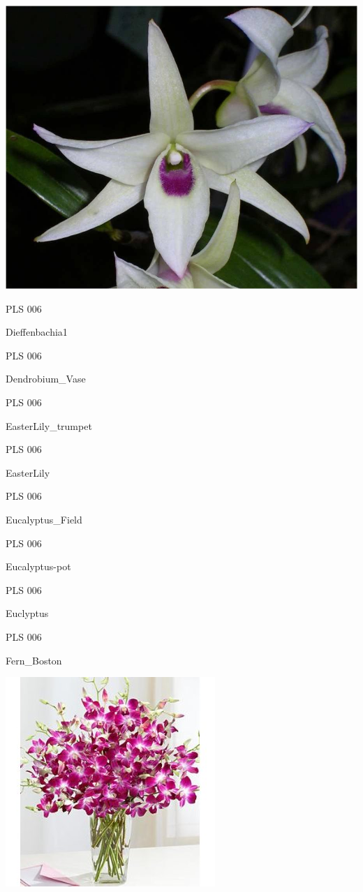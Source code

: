 \documentclass{article}
\begin{document}
\begin{center}
\includegraphics[height=0.925\paperheight]{../Dendrobium_Flower.jpg}
\end{center}
\newpage

\noindent  PLS 006
\vfill
\centerline{{\huge Dieffenbachia1 }}
\vfill
\newpage

\noindent  PLS 006
\vfill
\centerline{{\huge Dendrobium\_Vase }}
\vfill
\newpage

\noindent  PLS 006
\vfill
\centerline{{\huge EasterLily\_trumpet }}
\vfill
\newpage

\noindent  PLS 006
\vfill
\centerline{{\huge EasterLily }}
\vfill
\newpage

\noindent  PLS 006
\vfill
\centerline{{\huge Eucalyptus\_Field }}
\vfill
\newpage

\noindent  PLS 006
\vfill
\centerline{{\huge Eucalyptus-pot }}
\vfill
\newpage

\noindent  PLS 006
\vfill
\centerline{{\huge Euclyptus }}
\vfill
\newpage

\noindent  PLS 006
\vfill
\centerline{{\huge Fern\_Boston }}
\vfill
\newpage

\begin{center}
\includegraphics[height=0.925\paperheight]{../Dendrobium_Vase.jpg}
\end{center}
\newpage
\end{document}
